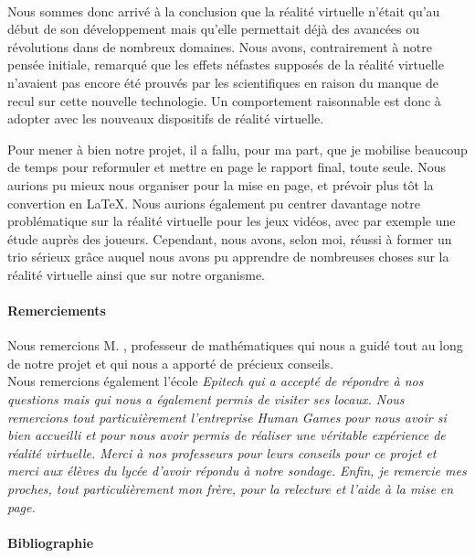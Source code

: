 \documentclass[11pt, a4paper]{article}
\begin{document}
\paragraph*{}
Nous sommes donc arrivé à la conclusion que la réalité virtuelle n'était qu'au début de son développement mais qu'elle permettait déjà des avancées ou révolutions dans de nombreux domaines. Nous avons, contrairement à notre pensée initiale, remarqué que les effets néfastes supposés de la réalité virtuelle n'avaient pas encore été prouvés par les scientifiques en raison du manque de recul sur cette nouvelle technologie. Un comportement raisonnable est donc à adopter avec les nouveaux dispositifs de réalité virtuelle.

Pour mener à bien notre projet, il a fallu, pour ma part, que je mobilise beaucoup de temps pour reformuler et mettre en page le rapport final, toute seule. Nous aurions pu mieux nous organiser pour la mise en page, et prévoir plus tôt la convertion en \LaTeX{}. Nous aurions également pu centrer davantage notre problématique sur la réalité virtuelle pour les jeux vidéos, avec par exemple une étude auprès des joueurs. Cependant, nous avons, selon moi, réussi à former un trio sérieux grâce auquel nous avons pu apprendre de nombreuses choses sur la réalité virtuelle ainsi que sur notre organisme.

\paragraph{Remerciements}
Nous remercions M. , professeur de mathématiques qui nous a guidé tout au long de notre projet et qui nous a apporté de précieux conseils. \\
Nous remercions également l'école \it{Epitech} qui a accepté de répondre à nos questions mais qui nous a également permis de visiter ses locaux.
Nous remercions tout particuièrement l'entreprise \it{Human Games} pour nous avoir si bien accueilli et pour nous avoir permis de réaliser une véritable expérience de réalité virtuelle.
Merci à nos professeurs pour leurs conseils pour ce projet et merci aux élèves du lycée d'avoir répondu à notre sondage.
Enfin, je remercie mes proches, tout particulièrement mon frère, pour la relecture et l'aide à la mise en page.

\paragraph{Bibliographie}
\end{document}
